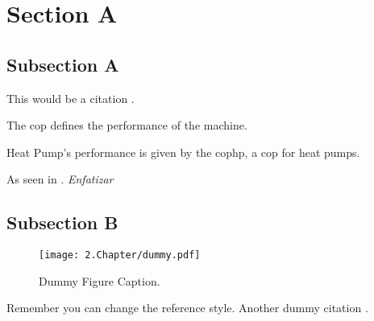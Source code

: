 \section{Section A}
\label{sec:sectiona}

\subsection{Subsection A}
\label{subsec:subasectionA}

This would be a citation \cite{dummy}.

The \gls{cop} defines the performance of the machine.

Heat Pump's performance is given by the \gls{cophp}, a \gls{cop} for heat pumps.

As seen in \cite{wiki}. \emph{Enfatizar}

\subsection{Subsection B}
\label{subsec:subbsectiona}

\begin{figure}[H]
	\centering
		\texttt{[image: 2.Chapter/dummy.pdf]}
	\caption[Dummy Figure Caption for List of Figures.]{Dummy Figure Caption.}
	\label{fig:dummyfigure1}
\end{figure}

Remember you can change the reference style. Another dummy citation \cite{site}.